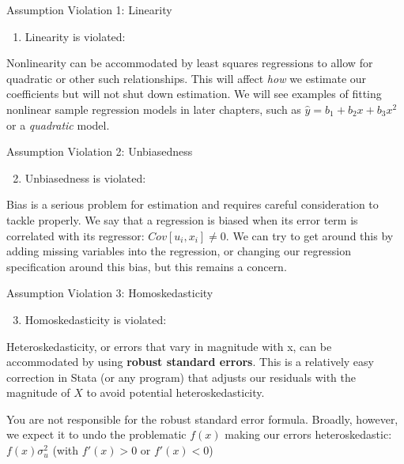 \documentclass[
  ignorenonframetext,
  english,
]{beamer}
\providecommand{\tightlist}{%
  \setlength{\itemsep}{0pt}\setlength{\parskip}{0pt}}
\begin{document}
\begin{frame}{Assumption Violation 1: Linearity}
\protect{}\label{assumption-violation-1-linearity}
\begin{enumerate}
\tightlist
\item
  Linearity is violated:
\end{enumerate}

Nonlinearity can be accommodated by least squares regressions to allow
for quadratic or other such relationships. This will affect \emph{how}
we estimate our coefficients but will not shut down estimation. We will
see examples of fitting nonlinear sample regression models in later
chapters, such as \(\hat{y}=b_1+b_2x+b_3x^2\) or a \emph{quadratic}
model.
\end{frame}

\begin{frame}{Assumption Violation 2: Unbiasedness}
\protect{}\label{assumption-violation-2-unbiasedness}
\begin{enumerate}
\setcounter{enumi}{1}
\tightlist
\item
  Unbiasedness is violated:
\end{enumerate}

Bias is a serious problem for estimation and requires careful
consideration to tackle properly. We say that a regression is biased
when its error term is correlated with its regressor:
\(Cov[u_i,x_i]\neq0\). We can try to get around this by adding missing
variables into the regression, or changing our regression specification
around this bias, but this remains a concern.
\end{frame}

\begin{frame}{Assumption Violation 3: Homoskedasticity}
\protect{}\label{assumption-violation-3-homoskedasticity}
\begin{enumerate}
\setcounter{enumi}{2}
\tightlist
\item
  Homoskedasticity is violated:
\end{enumerate}

Heteroskedasticity, or errors that vary in magnitude with x, can be
accommodated by using \textbf{robust standard errors}. This is a
relatively easy correction in Stata (or any program) that adjusts our
residuals with the magnitude of \(X\) to avoid potential
heteroskedasticity.

You are not responsible for the robust standard error formula. Broadly,
however, we expect it to undo the problematic \(f(x)\) making our errors
heteroskedastic: \(f(x)\sigma^2_u\) (with \(f'(x)>0\) or \(f'(x)<0\))
\end{frame}
\end{document}
